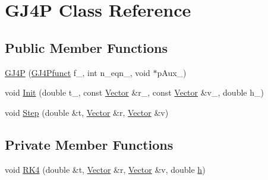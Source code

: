 \hypertarget{classGJ4P}{\section{G\-J4\-P Class Reference}
\label{classGJ4P}
}
\subsection*{Public Member Functions}
\begin{DoxyCompactItemize}
\item 
\hyperlink{classGJ4P_a767167f705037e20345053afa857238c}{G\-J4\-P} (\hyperlink{Exercise__4__2_8cpp_ad73be7c0c82be97eb6a69c195369217a}{G\-J4\-Pfunct} f\-\_\-, int n\-\_\-eqn\-\_\-, void $\ast$p\-Aux\-\_\-)
\item 
void \hyperlink{classGJ4P_ad549e0ad4a301c22492e60e6c237a791}{Init} (double t\-\_, const \hyperlink{classVector}{Vector} \&r\-\_, const \hyperlink{classVector}{Vector} \&v\-\_, double h\-\_\-)
\item 
void \hyperlink{classGJ4P_a44f0bf0441af880ade30f8bb9c8a26d8}{Step} (double \&t, \hyperlink{classVector}{Vector} \&r, \hyperlink{classVector}{Vector} \&v)
\end{DoxyCompactItemize}
\subsection*{Private Member Functions}
\begin{DoxyCompactItemize}
\item 
void \hyperlink{classGJ4P_a4a31761a8af65b7dc18f0cd709830227}{R\-K4} (double \&t, \hyperlink{classVector}{Vector} \&r, \hyperlink{classVector}{Vector} \&v, double \hyperlink{classGJ4P_a9753300eabe5c63cbb459b149c915fc7}{h})
\end{DoxyCompactItemize}
